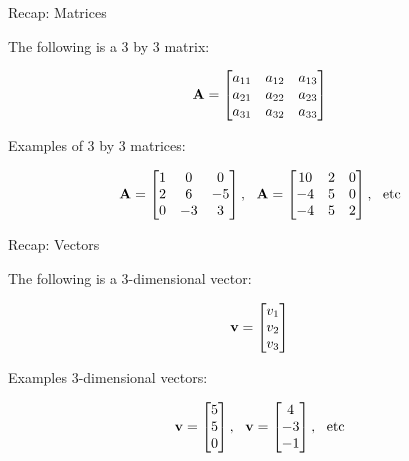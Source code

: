 \documentclass{beamer}
\begin{document}
\begin{frame}{Recap: Matrices}
	\begin{flushleft}
		
		The following is a 3 by 3 matrix:
		
		\begin{equation}
			\mathbf{A} =
			\begin{bmatrix}
			a_{11} & a_{12} & a_{13} \\
			a_{21} & a_{22} & a_{23} \\
			a_{31} & a_{32} & a_{33}
			\end{bmatrix}
		\end{equation}
		
		\bigskip
		Examples of 3 by 3 matrices:
		
		\begin{equation}
			\bo{A} =
			\begin{bmatrix}
				1 & 0 & 0 \\
				2 & 6 & -5 \\
				0 & -3 & 3
			\end{bmatrix},
		\ \ 
		\bo{A} =
		\begin{bmatrix}
			10 & 2 & 0 \\
			-4 & 5 & 0 \\
			-4 & 5 & 2
		\end{bmatrix},  \ \ \text{etc}
		\end{equation}
	
		
	\end{flushleft}
\end{frame}



\begin{frame}{Recap: Vectors}
	\begin{flushleft}
		
		The following is a 3-dimensional vector:
		
		\begin{equation}
			\mathbf{v} =
			\begin{bmatrix}
				v_{1}  \\
				v_{2}  \\
				v_{3}
			\end{bmatrix}
		\end{equation}
		
		\bigskip
		Examples 3-dimensional vectors:
		
		\begin{equation}
			\bo{v} =
			\begin{bmatrix}
				5 \\
				5 \\
				0
			\end{bmatrix},
			\ \ 
			\bo{v} =
			\begin{bmatrix}
				4 \\
				-3 \\
				-1
			\end{bmatrix},  \ \ \text{etc}
		\end{equation}
		
	\end{flushleft}
\end{frame}
\end{document}
